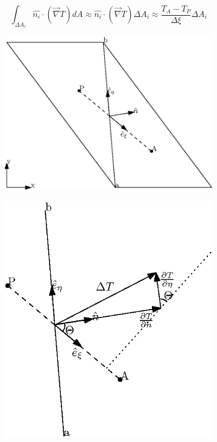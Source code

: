 \begin{equation}
    \label{eq:8.6}
    \int_{\Delta A_i} \hat{n_i} \cdot (\vec{\nabla}T)dA \approx \hat{n_i} \cdot (\vec{\nabla}T) \Delta A_i \approx \frac{T_A - T_P}{\Delta \xi} \Delta A_i
\end{equation}

\begin{figure}[ht]
    \begin{subfigure}{.5\textwidth}
        \centering
        \includegraphics[width=.8\linewidth]{fig/difusao-cruzada-a.eps}
        \caption{}
        \label{fig:8.1-a}
    \end{subfigure}
    \begin{subfigure}{.5\textwidth}
        \centering
        \includegraphics[width=.8\linewidth]{fig/difusao-cruzada-b.eps}
        \caption{}
        \label{fig:8.1-b}
    \end{subfigure}


\end{figure}
